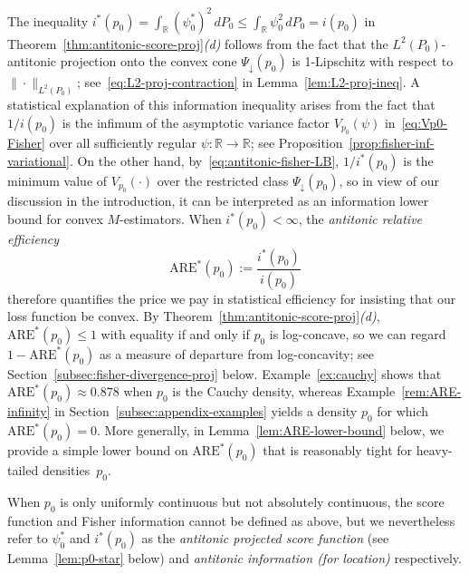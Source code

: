 \documentclass[a4paper]{article}
\newcommand{\R}{\mathbb{R}}
\newcommand{\norm}[1]{\|{#1}\|}
\newcommand{\ipr}[2]{\langle #1, #2 \rangle}
\theoremstyle{definition}
\begin{document}
The inequality $i^*(p_0) = \int_\R (\psi_0^*)^2\,dP_0 \leq \int_\R \psi_0^2\,dP_0 = i(p_0)$ in Theorem~\ref{thm:antitonic-score-proj}\emph{(d)} follows from the fact that the $L^2(P_0)$-antitonic projection onto the convex cone $\Psi_\downarrow(p_0)$ is 1-Lipschitz with respect to $\norm{{\cdot}}_{L^2(P_0)}$; see~\eqref{eq:L2-proj-contraction} in Lemma~\ref{lem:L2-proj-ineq}. A statistical explanation of this information inequality arises from the fact that $1/i(p_0)$ is the infimum of the asymptotic variance factor $V_{p_0}(\psi)$ in~\eqref{eq:Vp0-Fisher} over all sufficiently regular $\psi \colon \R \to \R$; see Proposition~\ref{prop:fisher-inf-variational}. On the other hand, by~\eqref{eq:antitonic-fisher-LB}, $1/i^*(p_0)$ is the minimum value of $V_{p_0}(\cdot)$ over the restricted class $\Psi_\downarrow(p_0)$, so in view of our discussion in the introduction, it can be interpreted as an information lower bound for convex $M$-estimators. When $i^*(p_0) < \infty$, the \textit{antitonic relative efficiency} 
\[
\mathrm{ARE}^*(p_0) := \frac{i^*(p_0)}{i(p_0)}
\]
therefore quantifies the price we pay in statistical efficiency for insisting that our loss function be convex. By Theorem~\ref{thm:antitonic-score-proj}\emph{(d)}, $\mathrm{ARE}^*(p_0) \leq 1$ with equality if and only if $p_0$ is log-concave, so we can regard $1 - \mathrm{ARE}^*(p_0)$ as a measure of departure from log-concavity; see Section~\ref{subsec:fisher-divergence-proj} below. Example~\ref{ex:cauchy} shows that $\mathrm{ARE}^*(p_0) \approx 0.878$ when $p_0$ is the Cauchy density, whereas Example~\ref{rem:ARE-infinity} in Section~\ref{subsec:appendix-examples} yields a density $p_0$ for which $\mathrm{ARE}^*(p_0) = 0$. More generally, in Lemma~\ref{lem:ARE-lower-bound} below, we provide a simple lower bound on $\mathrm{ARE}^*(p_0)$ that is reasonably tight for heavy-tailed densities~$p_0$.

When $p_0$ is only uniformly continuous but not absolutely continuous, the score function and Fisher information cannot be defined as above, but we nevertheless refer to $\psi_0^*$ and $i^*(p_0)$ as the \emph{antitonic projected score function} (see Lemma~\ref{lem:p0-star} below) and \emph{antitonic information (for location)} respectively. 
\end{document}
